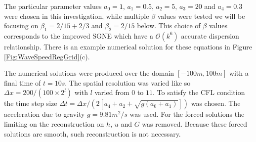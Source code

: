 \documentclass[10pt]{elsarticle}
\begin{document}
The particular parameter values $a_0=1$, $a_1=0.5$, $a_2 = 5$, $a_3=20$ and $a_4=0.3$ were chosen in this investigation, while multiple $\beta$ values were tested we will be focusing on $\beta_1 = 2/15 + 2/3$ and $\beta_2 =2/15$ below. This choice of $\beta$ values corresponds to the improved SGNE which have a $\mathcal{O}\left(k^6\right)$ accurate dispersion relationship. There is an example numerical solution for these equations in Figure \ref{Fig:WaveSpeedRegGrid}(c). 

The numerical solutions were produced over the domain $\left[-100m,100m\right]$ with a final time of $t=10s$. The spatial resolution was varied like so $\Delta x = 200 / (100 \times 2^{l})$ with $l$ varied from $0$ to $11$. To satisfy the CFL condition the time step size $\Delta t = \Delta x  / \left( 2 \left[a_4 + a_2+ \sqrt{g \left(a_0 + a_1\right)}\right] \right)$ was chosen. The acceleration due to gravity $g=9.81m^2/s$ was used. For the forced solutions the limiting on the reconstruction on $h$, $u$ and $G$ was removed. Because these forced solutions are smooth, such reconstruction is not necessary.
\end{document}
